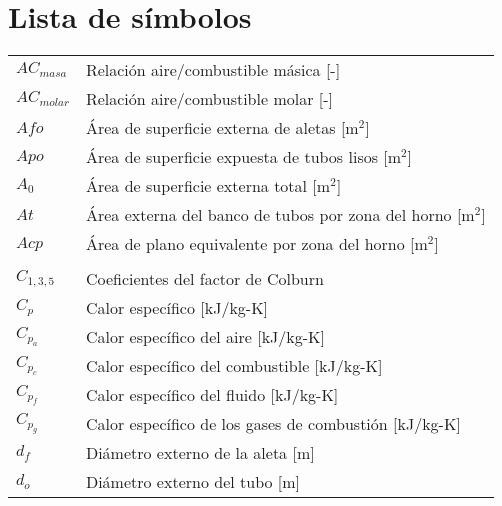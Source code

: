 \chapter*{Lista de símbolos}
\begin{tabular}{ll}

$AC_{masa}$ & Relación aire/combustible másica [-] \\
$AC_{molar}$& Relación aire/combustible molar [-] \\
$Afo$   & Área de superficie externa de aletas [m$^2$] \\
$Apo$   & Área de superficie expuesta de tubos lisos [m$^2$] \\
$A_0$   & Área de superficie externa total [m$^2$] \\
$At$    & Área externa del banco de tubos por zona del horno [m$^2$] \\
$Acp$   & Área de plano equivalente por zona del horno [m$^2$] \\
\\
$C_{1,3,5}$ & Coeficientes del factor de Colburn \\
$C_p$   & Calor específico [kJ/kg-K] \\
$C_{p_a}$   & Calor específico del aire [kJ/kg-K] \\
$C_{p_c}$   & Calor específico del combustible [kJ/kg-K] \\
$C_{p_f}$   & Calor específico del fluido [kJ/kg-K] \\
$C_{p_g}$   & Calor específico de los gases de combustión [kJ/kg-K] \\

$d_f$ & Diámetro externo de la aleta [m] \\
$d_o$ & Diámetro externo del tubo [m] \\


\end{tabular}
